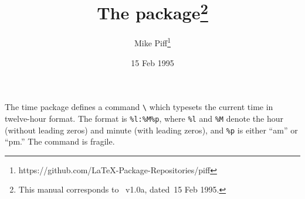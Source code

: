 \documentclass[pagesize=auto, fontsize=14pt, parskip=full, DIV=9]{scrartcl}
\title{The \pkg{time} package\thanks{This manual corresponds to \pkg{time.sty}~v1.0a, dated~15 Feb 1995.}}
\author{Mike Piff\thanks{https://github.com/LaTeX-Package-Repositories/piff}}
\date{15 Feb 1995}
\makeatletter
\newcommand*{\pkg}[1]{\textsf{#1}}
\newcommand*{\cs}[1]{\texttt{\textbackslash#1}}
\newcommand*{\cmd}[1]{\cs{\expandafter\@gobble\string#1}}
\makeatother
\begin{document}
\maketitle

The \pkg{time} package defines a command \cmd{\now} which typesets the current time in twelve-hour format.
The format is \verb|%l:%M%p|, where \verb|%l| and \verb|%M| denote the hour (without leading zeros) and minute (with leading zeros), and \verb|%p| is either ``am'' or ``pm.''
The command is fragile.
\end{document}
